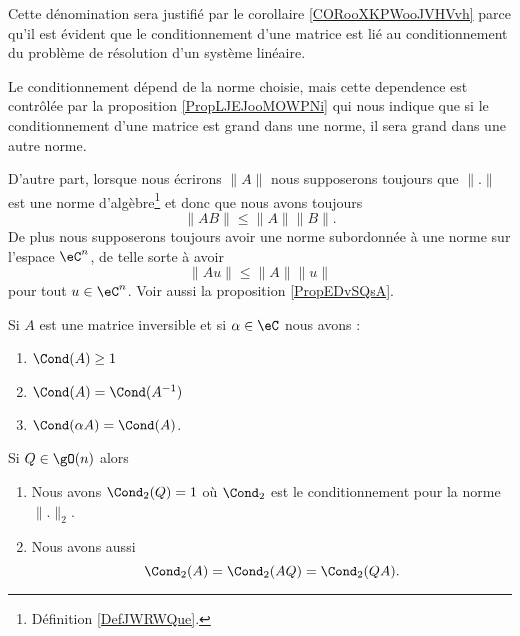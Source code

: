 Cette dénomination sera justifié par le corollaire \ref{CORooXKPWooJVHVvh} parce qu'il est évident que le conditionnement d'une matrice est lié au conditionnement du problème de résolution d'un système linéaire.

\begin{remark}
    Le conditionnement dépend de la norme choisie, mais cette dependence est contrôlée par la proposition \ref{PropLJEJooMOWPNi} qui nous indique que si le conditionnement d'une matrice est grand dans une norme, il sera grand dans une autre norme.

    D'autre part, lorsque nous écrirons \( \| A \|\) nous supposerons toujours que \( \| . \|\) est une norme d'algèbre\footnote{Définition \ref{DefJWRWQue}.} et donc que nous avons toujours
    \begin{equation}
        \| AB \|\leq \| A \|\| B \|.
    \end{equation}
    De plus nous supposerons toujours avoir une norme subordonnée à une norme sur l'espace \( \eC^n\), de telle sorte à avoir
    \begin{equation}
        \| Au \|\leq \| A \|\| u \|
    \end{equation}
    pour tout \( u\in\eC^n\). Voir aussi la proposition \ref{PropEDvSQsA}.
\end{remark}

\begin{proposition}
    Si \( A\) est une matrice inversible et si \( \alpha\in \eC\) nous avons :
    \begin{enumerate}
        \item
            \( \Cond(A)\geq 1\)
        \item
            \( \Cond(A)=\Cond(A^{-1})\)
        \item
            \( \Cond(\alpha A)=\Cond(A)\).
    \end{enumerate}
    Si \( Q\in\gO(n)\) alors
    \begin{enumerate}
        \item
            Nous avons \( \Cond_2(Q)=1\) où \( \Cond_2\) est le conditionnement pour la norme \( \| . \|_2\).
        \item
            Nous avons aussi
            \begin{equation}
                \Cond_2(A)=\Cond_2(AQ)=\Cond_2(QA).
            \end{equation}
    \end{enumerate}
\end{proposition}


